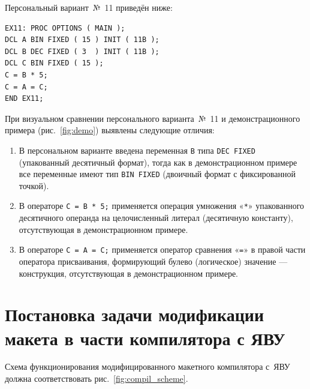 \documentclass[a4paper,14pt]{extarticle}
\begin{document}
Персональный вариант~№~11 приведён ниже:

\begin{lstlisting}[style=PLIstyle]
EX11: PROC OPTIONS ( MAIN );
DCL A BIN FIXED ( 15 ) INIT ( 11B );
DCL B DEC FIXED ( 3  ) INIT ( 11B );
DCL C BIN FIXED ( 15 );
C = B * 5;
C = A = C;
END EX11;
\end{lstlisting}

При визуальном сравнении персонального варианта~№~11 и демонстрационного примера
(рис.~\ref{fig:demo}) выявлены следующие отличия:

\begin{enumerate}
  \item В персональном варианте введена переменная \texttt{B} типа
        \texttt{DEC FIXED} (упакованный десятичный формат), тогда как в
        демонстрационном примере все переменные имеют тип \texttt{BIN FIXED}
        (двоичный формат с фиксированной точкой).

  \item В операторе \texttt{C = B * 5;} применяется операция умножения «\texttt{*}»
        упакованного десятичного операнда на целочисленный литерал (десятичную
        константу), отсутствующая в демонстрационном примере.

  \item В операторе \texttt{C = A = C;} применяется оператор сравнения «\texttt{=}»
        в правой части оператора присваивания, формирующий булево (логическое)
        значение — конструкция, отсутствующая в демонстрационном примере.
\end{enumerate}

\section{Постановка задачи модификации макета в части компилятора с ЯВУ}

Схема функционирования модифицированного макетного компилятора с~ЯВУ должна
соответствовать рис.~\ref{fig:compil_scheme}.
\end{document}
